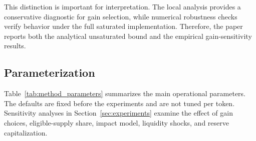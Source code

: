 \documentclass[a4paper,fleqn]{cas-dc}
\begin{document}
This distinction is important for interpretation. The local analysis provides a conservative diagnostic for gain selection, while numerical robustness checks verify behavior under the full saturated implementation. Therefore, the paper reports both the analytical unsaturated bound and the empirical gain-sensitivity results.

\subsection{Parameterization}
\label{subsec:parameterization}

Table~\ref{tab:method_parameters} summarizes the main operational parameters. The defaults are fixed before the experiments and are not tuned per token. Sensitivity analyses in Section~\ref{sec:experiments} examine the effect of gain choices, eligible-supply share, impact model, liquidity shocks, and reserve capitalization.
\end{document}
